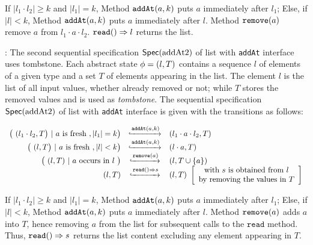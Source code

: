 If $\vert l_1 \cdot l_2 \vert \geq k$ and $\vert l_1 \vert = k$, Method $\alabelshort[\mathtt{addAt}]{a,k}$ puts $a$ immediately after $l_1$; Else, if $\vert l \vert <k$, Method $\alabelshort[\mathtt{addAt}]{a,k}$ puts $a$ immediately after $l$. Method $\alabelshort[\mathtt{remove}]{a}$ remove $a$ from $l_1 \cdot a \cdot l_2$. $\alabellong[\mathtt{read}]{}{l}{}$ returns the list. 


: The second sequential specification $\specAddatTwo$ of list with {\tt addAt} interface uses tombstone. Each abstract state $\abstate = (l,T)$ contains a sequence $l$ of elements of a given type and a set $T$ of elements appearing in the list. The element $l$ is the list of all input values, whether already removed or not; while $T$ stores the removed values and is used as \emph{tombstone}. The sequential specification $\specAddatTwo$ of list with {\tt addAt} interface is given with the transitions as follows:

\[
  \begin{array}{rcl}
    \big(\ (l_1 \cdot l_2,T\big)\ |\ a\text{ is fresh}\ , \vert l_1 \vert = k \big)
     & \specarrow{\alabelshort[\mathtt{addAt}]{a,k}}
     & (l_1 \cdot a \cdot l_2,T)\\ 
     \big(\ (l,T\big)\ |\ a\text{ is fresh}\ , \vert l \vert < k \big)
     & \specarrow{\alabelshort[\mathtt{addAt}]{a,k}}
     & (l \cdot a,T)\\
     \big(\ (l,T)\ |\ a\ \text{occurs in}\ l\ \big)
     & \specarrow{\alabelshort[\mathtt{remove}]{a}}
     & (l,T \cup \{a\})\\
     (l,T)
     & \specarrow{\alabellong[\mathtt{read}]{}{s}{}}
     & (l,T)\
       \left[\begin{array}{c}
           \text{with $s$ is obtained from $l$}\\
           \text{by removing the values in $T$}
       \end{array}\right]
   \end{array}
\] 

If $\vert l_1 \cdot l_2 \vert \geq k$ and $\vert l_1 \vert = k$, Method $\alabelshort[\mathtt{addAt}]{a,k}$ puts $a$ immediately after $l_1$; Else, if $\vert l \vert <k$, Method $\alabelshort[\mathtt{addAt}]{a,k}$ puts $a$ immediately after $l$. Method $\alabelshort[\mathtt{remove}]{a}$ adds $a$ into $T$, hence removing $a$ from the list for subsequent calls to the $\mathtt{read}$ method. Thus, $\alabellong[\mathtt{read}]{}{s}{}$ returns the list content excluding any element appearing in $T$. 



